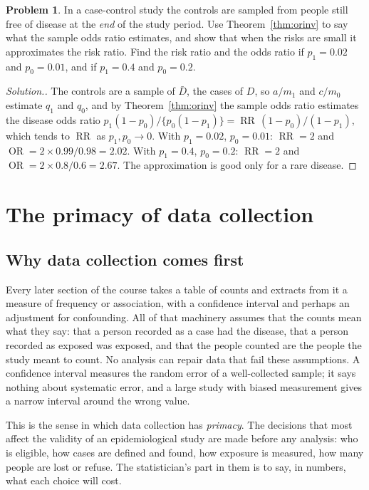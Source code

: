 \documentclass[11pt,a4paper]{article}
\numberwithin{equation}{section}
\DeclareMathOperator{\OR}{OR}
\DeclareMathOperator{\RR}{RR}
\theoremstyle{definition}
\newtheorem{problemx}{Problem}[subsection]
\newenvironment{problem}{\begin{problemx}}{\end{problemx}}
\newenvironment{solution}
  {\renewcommand{\qedsymbol}{}\begin{proof}[\textit{Solution}.]}
  {\end{proof}}
\begin{document}
\begin{problem}
In a case-control study the controls are sampled from people still free of disease at the \emph{end} of the study period. Use
Theorem~\ref{thm:orinv} to say what the sample odds ratio estimates, and show that when the risks are small it approximates the risk ratio.
Find the risk ratio and the odds ratio if $p_1 = 0.02$ and $p_0 = 0.01$, and if $p_1 = 0.4$ and $p_0 = 0.2$.
\end{problem}

\begin{solution}
The controls are a sample of $\bar D$, the cases of $D$, so $a/m_1$ and $c/m_0$ estimate $q_1$ and $q_0$, and by Theorem~\ref{thm:orinv} the sample
odds ratio estimates the disease odds ratio $p_1(1 - p_0)/\{p_0(1 - p_1)\} = \RR\,(1 - p_0)/(1 - p_1)$, which tends to $\RR$ as $p_1, p_0 \to 0$.
With $p_1 = 0.02$, $p_0 = 0.01$: $\RR = 2$ and $\OR = 2 \times 0.99/0.98 = 2.02$. With $p_1 = 0.4$, $p_0 = 0.2$: $\RR = 2$ and $\OR = 2 \times 0.8/0.6 = 2.67$.
The approximation is good only for a rare disease.
\end{solution}

\section{The primacy of data collection}
\label{sec:data}

\subsection{Why data collection comes first}

Every later section of the course takes a table of counts and extracts from it a measure of frequency or association, with a confidence
interval and perhaps an adjustment for confounding. All of that machinery assumes that the counts mean what they say: that a person
recorded as a case had the disease, that a person recorded as exposed was exposed, and that the people counted are the people the study
meant to count. No analysis can repair data that fail these assumptions. A confidence interval measures the random error of a
well-collected sample; it says nothing about systematic error, and a large study with biased measurement gives a narrow interval around
the wrong value.

This is the sense in which data collection has \emph{primacy}. The decisions that most affect the validity of an epidemiological study are
made before any analysis: who is eligible, how cases are defined and found, how exposure is measured, how many people are lost or refuse.
The statistician's part in them is to say, in numbers, what each choice will cost.
\end{document}
